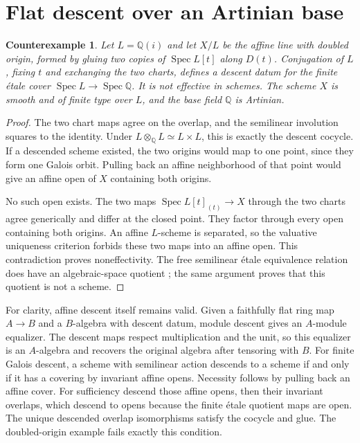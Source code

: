\documentclass[11pt,a4paper]{article}
\newtheorem{counterexample}[theorem]{Counterexample}
\theoremstyle{definition}
\newcommand{\Spec}{\operatorname{Spec}}
\newcommand{\Q}{\mathbb Q}
\begin{document}
\section{Flat descent over an Artinian base}\label{sec:descent}
\begin{counterexample}\label{ex:descent}
Let $L=\Q(i)$ and let $X/L$ be the affine line with doubled origin, formed by gluing two copies of $\Spec L[t]$ along $D(t)$. Conjugation of $L$, fixing $t$ and exchanging the two charts, defines a descent datum for the finite étale cover $\Spec L\to\Spec\Q$. It is not effective in schemes. The scheme $X$ is smooth and of finite type over $L$, and the base field $\Q$ is Artinian.
\end{counterexample}
\begin{proof}
The two chart maps agree on the overlap, and the semilinear involution squares to the identity. Under $L\otimes_\Q L\simeq L\times L$, this is exactly the descent cocycle. If a descended scheme existed, the two origins would map to one point, since they form one Galois orbit. Pulling back an affine neighborhood of that point would give an affine open of $X$ containing both origins.

No such open exists. The two maps $\Spec L[t]_{(t)}\to X$ through the two charts agree generically and differ at the closed point. They factor through every open containing both origins. An affine $L$-scheme is separated, so the valuative uniqueness criterion forbids these two maps into an affine open. This contradiction proves noneffectivity. The free semilinear étale equivalence relation does have an algebraic-space quotient \cite[Theorem~80.10.1, tag 04S6]{Stacks}; the same argument proves that this quotient is not a scheme.
\end{proof}

For clarity, affine descent itself remains valid. Given a faithfully flat ring map $A\to B$ and a $B$-algebra with descent datum, module descent gives an $A$-module equalizer. The descent maps respect multiplication and the unit, so this equalizer is an $A$-algebra and recovers the original algebra after tensoring with $B$. For finite Galois descent, a scheme with semilinear action descends to a scheme if and only if it has a covering by invariant affine opens. Necessity follows by pulling back an affine cover. For sufficiency descend those affine opens, then their invariant overlaps, which descend to opens because the finite étale quotient maps are open. The unique descended overlap isomorphisms satisfy the cocycle and glue. The doubled-origin example fails exactly this condition.
\end{document}
